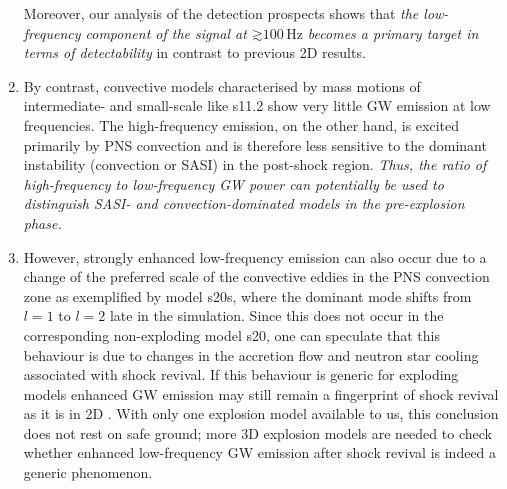 \begin{enumerate}
  Moreover, our analysis of the detection prospects shows that 
\emph{the low-frequency component of the signal at $\mathord{\gtrsim} 100 \, \mathrm{Hz}$
 becomes a primary target in terms of detectability} in contrast to previous 2D results.     
\item By contrast, convective models characterised by mass motions of
  intermediate- and small-scale like s11.2 show very little GW emission at low frequencies. 
  The high-frequency emission, on the other hand, is excited primarily by PNS convection and is therefore less sensitive to the dominant 
  instability (convection or SASI) in the post-shock region.
  \emph{Thus, the ratio of high-frequency to low-frequency GW power
  can potentially be used to distinguish SASI- and convection-dominated
  models in the pre-explosion phase.}
\item However, strongly enhanced low-frequency emission can also occur
  due to a change of the preferred scale of the convective eddies in
  the PNS convection zone as exemplified by model s20s, where the
  dominant mode shifts from $l=1$ to $l=2$ late in the
  simulation. Since this does not occur in the corresponding
  non-exploding model s20, one can speculate that this behaviour is due
  to changes in the accretion flow and neutron star cooling associated
  with shock revival. If this behaviour is generic for exploding
  models enhanced GW emission may still remain a fingerprint
  of shock revival as it is in 2D \citep{murphy_09,mueller_13}. With
  only one explosion model available to us, this conclusion does not
  rest on safe ground; more 3D explosion models are needed to check
  whether enhanced low-frequency GW emission after shock revival is
  indeed a generic phenomenon.
\end{enumerate}

